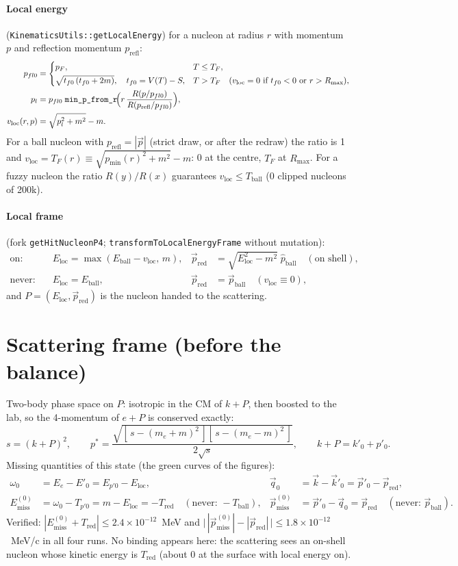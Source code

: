 \documentclass[11pt]{article}
\newcommand{\vv}[1]{\vec{#1}}
\newcommand{\ball}{\mathrm{ball}}
\newcommand{\red}{\mathrm{red}}
\newcommand{\loc}{\mathrm{loc}}
\newcommand{\miss}{\mathrm{miss}}
\newcommand{\refl}{\mathrm{refl}}
\newcommand{\Rmax}{R_{\max}}
\newcommand{\pF}{p_F}
\newcommand{\TF}{T_F}
\newcommand{\code}[1]{\texttt{#1}}
\newcommand{\codem}[1]{\text{\texttt{#1}}}
\begin{document}
\paragraph{Local energy} (\code{KinematicsUtils::getLocalEnergy}) for a nucleon at
radius $r$ with momentum $p$ and reflection momentum $p_\refl$:
\begin{align*}
p_{fl0}&=\begin{cases}
\pF, & T\le\TF,\\[2pt]
\sqrt{t_{f0}\,(t_{f0}+2m)},\quad t_{f0}=V(T)-S, & T>\TF
\quad(v_\loc=0\ \text{if } t_{f0}<0 \text{ or } r>\Rmax),
\end{cases}\\
p_l&=p_{fl0}\;\codem{min\_p\_from\_r}\!\Big(r\,\frac{R(p/p_{fl0})}{R(p_\refl/p_{fl0})}\Big),\\
v_\loc(r,p)&=\sqrt{p_l^2+m^2}-m.
\end{align*}
For a ball nucleon with $p_\refl=|\vv p|$ (strict draw, or after the redraw) the ratio
is 1 and $v_\loc=\TF(r)\equiv\sqrt{p_{\min}(r)^2+m^2}-m$: 0 at the centre, $\TF$ at
$\Rmax$. For a fuzzy nucleon the ratio $R(y)/R(x)$ guarantees $v_\loc\le T_\ball$
(0 clipped nucleons of 200k).

\paragraph{Local frame} (fork \code{getHitNucleonP4};
\code{transformToLocalEnergyFrame} without mutation):
\begin{align*}
\text{on:}\quad & E_\loc=\max(E_\ball-v_\loc,\,m), &
\vv p_\red&=\sqrt{E_\loc^2-m^2}\;\hat{p}_\ball \quad(\text{on shell}),\\
\text{never:}\quad & E_\loc=E_\ball, &
\vv p_\red&=\vv p_\ball \quad(v_\loc\equiv0),
\end{align*}
and $P=(E_\loc,\vv p_\red)$ is the nucleon handed to the scattering.

\section{Scattering frame (before the balance)}

Two-body phase space on $P$: isotropic in the CM of $k+P$, then boosted to the lab,
so the 4-momentum of $e+P$ is conserved exactly:
\begin{equation*}
s=(k+P)^2,\qquad
p^*=\frac{\sqrt{[\,s-(m_e+m)^2\,][\,s-(m_e-m)^2\,]}}{2\sqrt s},\qquad
k+P=k'_0+p'_0 .
\end{equation*}
Missing quantities of this state (the green curves of the figures):
\begin{align*}
\omega_0&=E_e-E'_0=E_{p'0}-E_\loc, &
\vv q_0&=\vv k-\vv k'_0=\vv p'_0-\vv p_\red,\\
E^{(0)}_\miss&=\omega_0-T_{p'0}=m-E_\loc=-T_\red \quad(\text{never: }-T_\ball), &
\vv p^{(0)}_\miss&=\vv p'_0-\vv q_0=\vv p_\red \quad(\text{never: }\vv p_\ball).
\end{align*}
Verified: $|E^{(0)}_\miss+T_\red|\le2.4\times10^{-12}$~MeV and
$\big|\,|\vv p^{(0)}_\miss|-|\vv p_\red|\,\big|\le1.8\times10^{-12}$~MeV/c in all four
runs. No binding appears here: the scattering sees an on-shell nucleon whose kinetic
energy is $T_\red$ (about 0 at the surface with local energy on).
\end{document}

